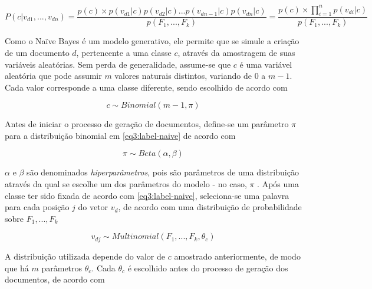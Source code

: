 \begin{equation}
\label{eq2:naive}
\ensuremath{P(c | v_{d1}, ..., v_{dn}) = \frac{p(c) \times p(v_{d1} |  c)p(v_{d2} | c)...p(v_{dn - 1} | c)p(v_{dn} | c)}{p(F_1, ..., F_k)} = \frac{p(c) \times \prod_{i = 1}^{n} p(v_{di} |  c)}{p(F_1, ..., F_k)}}
\end{equation}


Como o Naïve Bayes é um modelo generativo, ele permite que se simule a criação de um documento \ensuremath{d}, pertencente a uma classe \ensuremath{c}, através da amostragem de suas variáveis aleatórias. Sem perda de generalidade, assume-se que \ensuremath{c} é uma variável aleatória que pode assumir \ensuremath{m} valores naturais distintos, variando de 0 a \ensuremath{m - 1}. Cada valor corresponde a uma classe diferente, sendo escolhido de acordo com  

\begin{equation}
\label{eq3:label-naive}
\ensuremath{c \sim Binomial(m - 1, \pi)}
\end{equation}

Antes de iniciar o processo de geração de documentos, define-se um parâmetro \ensuremath{\pi} para a distribuição binomial em \ref{eq3:label-naive} de acordo com

\begin{equation}
\label{eq4:pi-naive}
\ensuremath{\pi \sim Beta(\alpha, \beta)}
\end{equation}

\ensuremath{\alpha} e \ensuremath{\beta} são denominados \emph{hiperparâmetros}, pois são parâmetros de uma distribuição através da qual se escolhe um dos parâmetros do modelo - no caso, \ensuremath{\pi} \cite{gibbs}. Após uma classe ter sido fixada de acordo com \ref{eq3:label-naive}, seleciona-se uma palavra para cada posição \ensuremath{j} do vetor \ensuremath{v_d}, de acordo com uma distribuição de probabilidade sobre \ensuremath{F_1, ..., F_k}

\begin{equation}
\label{eq5:multi-naive}
\ensuremath{v_{dj} \sim Multinomial(F_1, ..., F_k, \theta_c)}
\end{equation}

A distribuição utilizada depende do valor de \ensuremath{c} amostrado anteriormente, de modo que há \ensuremath{m} parâmetros \ensuremath{\theta_c}. Cada \ensuremath{\theta_c} é escolhido antes do processo de geração dos documentos, de acordo com

